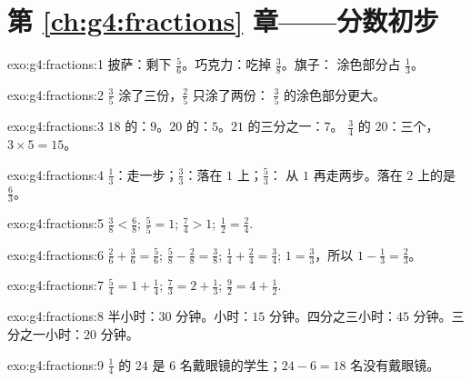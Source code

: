 \section*{第 \ref{ch:g4:fractions} 章——分数初步}

\begin{solution}{exo:g4:fractions:1}
披萨：剩下 $\frac56$。巧克力：吃掉 $\frac38$。旗子：
涂色部分占 $\frac13$。
\end{solution}

\begin{solution}{exo:g4:fractions:2}
$\frac35$ 涂了三份，$\frac25$ 只涂了两份：
$\frac35$ 的涂色部分更大。
\end{solution}

\begin{solution}{exo:g4:fractions:3}
$18$ 的：$9$。$20$ 的：$5$。$21$ 的三分之一：$7$。
$\frac34$ 的 $20$：三个，$3 \times 5 = 15$。
\end{solution}

\begin{solution}{exo:g4:fractions:4}
$\frac13$：走一步；$\frac33$：落在 $1$ 上；$\frac53$：
从 $1$ 再走两步。落在 $2$ 上的是 $\frac63$。
\end{solution}

\begin{solution}{exo:g4:fractions:5}
$\frac38 < \frac68$; \quad $\frac55 = 1$; \quad $\frac74 > 1$;
\quad $\frac12 = \frac24$.
\end{solution}

\begin{solution}{exo:g4:fractions:6}
$\frac26 + \frac36 = \frac56$; \quad
$\frac58 - \frac28 = \frac38$; \quad
$\frac14 + \frac24 = \frac34$; \quad
$1 = \frac33$，所以 $1 - \frac13 = \frac23$。
\end{solution}

\begin{solution}{exo:g4:fractions:7}
$\frac54 = 1 + \frac14$; \quad
$\frac73 = 2 + \frac13$; \quad
$\frac92 = 4 + \frac12$.
\end{solution}

\begin{solution}{exo:g4:fractions:8}
半小时：$30$ 分钟。小时：$15$ 分钟。四分之三小时：$45$
分钟。三分之一小时：$20$ 分钟。
\end{solution}

\begin{solution}{exo:g4:fractions:9}
$\frac14$ 的 $24$ 是 $6$ 名戴眼镜的学生；$24 - 6 = 18$
名没有戴眼镜。
\end{solution}

